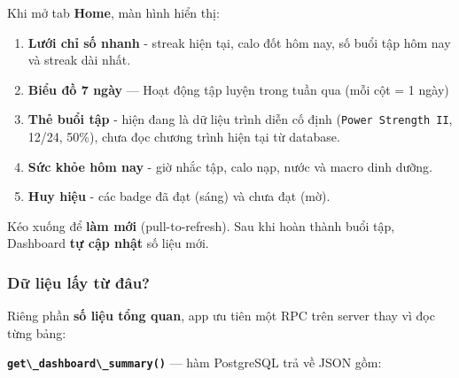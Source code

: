 \documentclass[12pt,a4paper]{article}
\providecommand{\passthrough}[1]{#1}
\providecommand{\tightlist}{%
  \setlength{\itemsep}{0pt}\setlength{\parskip}{0pt}}
\begin{document}
Khi mở tab \textbf{Home}, màn hình hiển thị:

\begin{enumerate}
\def\labelenumi{\arabic{enumi}.}
\tightlist
\item
  \textbf{Lưới chỉ số nhanh} - streak hiện tại, calo đốt hôm nay, số
  buổi tập hôm nay và streak dài nhất.
\item
  \textbf{Biểu đồ 7 ngày} --- Hoạt động tập luyện trong tuần qua (mỗi
  cột = 1 ngày)
\item
  \textbf{Thẻ buổi tập} - hiện đang là dữ liệu trình diễn cố định
  (\passthrough{\lstinline!Power Strength II!}, 12/24, 50\%), chưa đọc
  chương trình hiện tại từ database.
\item
  \textbf{Sức khỏe hôm nay} - giờ nhắc tập, calo nạp, nước và macro dinh
  dưỡng.
\item
  \textbf{Huy hiệu} - các badge đã đạt (sáng) và chưa đạt (mờ).
\end{enumerate}

Kéo xuống để \textbf{làm mới} (pull-to-refresh). Sau khi hoàn thành buổi
tập, Dashboard \textbf{tự cập nhật} số liệu mới.

\subsubsection{Dữ liệu lấy từ
đâu?}\label{dux1eef-liux1ec7u-lux1ea5y-tux1eeb-ux111uxe2u}

Riêng phần \textbf{số liệu tổng quan}, app ưu tiên một RPC trên server
thay vì đọc từng bảng:

\textbf{\passthrough{\lstinline!get\_dashboard\_summary()!}} --- hàm
PostgreSQL trả về JSON gồm:
\end{document}
